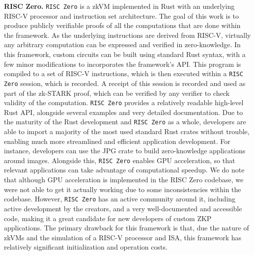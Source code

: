 \textbf{RISC Zero.}
\texttt{RISC Zero} is a zkVM \cite{RISCZero2023DeveloperDocs} implemented in Rust with an underlying RISC-V processor and instruction set architecture. The goal of this work is to produce publicly verifiable proofs of all the computations that are done within the framework. As the underlying instructions are derived from RISC-V, virtually any arbitrary computation can be expressed and verified in zero-knowledge.
In this framework, custom circuits can be built using standard Rust syntax, with a few minor modifications to incorporates the framework's API. This program is compiled to a set of RISC-V instructions, which is then executed within a \texttt{RISC Zero} session, which is recorded. A receipt of this session is recorded and used as part of the zk-STARK proof, which can be verified by any verifier to check validity of the computation.
\texttt{RISC Zero} provides a relatively readable high-level Rust API, alongside several examples and very detailed documentation. Due to the maturity of the Rust development and \texttt{RISC Zero} as a whole, developers are able to import a majority of the most used standard Rust crates without trouble, enabling much more streamlined and efficient application development. For instance, developers can use the JPG crate \cite{RustImageCrate2023} to build zero-knowledge applications around images. Alongside this, \texttt{RISC Zero} enables GPU acceleration, so that relevant applications can take advantage of computational speedup. We do note that although GPU acceleration is implemented in the RISC Zero codebase, we were not able to get it actually working due to some inconsistencies within the codebase. However, \texttt{RISC Zero} has an active community around it, including active development by the creators, and a very well-documented and accessible code, making it a great candidate for new developers of custom ZKP applications. The primary drawback for this framework is that, due the nature of zkVMs and the simulation of a RISC-V processor and ISA, this framework has relatively significant initialization and operation costs.